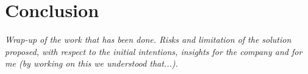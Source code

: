 \chapter{Conclusion}
\label{cha:conclusion}
\textit{Wrap-up of the work that has been done. Risks and limitation of the solution proposed, with respect to the initial intentions, insights for the company and for me (by working on this we understood that...).}

